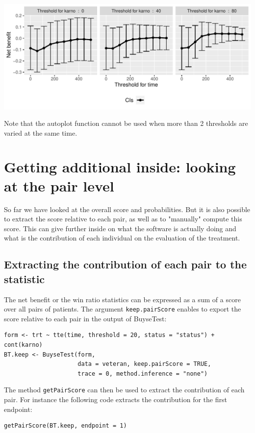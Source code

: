 \documentclass[12pt]{article}
\begin{document}
\begin{center}
\includegraphics[width=\textwidth]{./figures/gg-sensitivity2.pdf}
\end{center}

Note that the autoplot function cannot be used when more than 2
thresholds are varied at the same time.

\section{Getting additional inside: looking at the pair level}
\label{sec:org6c9f1b6}

So far we have looked at the overall score and probabilities. But it
is also possible to extract the score relative to each pair, as well
as to "manually" compute this score. This can give further inside on
what the software is actually doing and what is the contribution of
each individual on the evaluation of the treatment.

\subsection{Extracting the contribution of each pair to the statistic}
\label{sec:orgd15388a}
The net benefit or the win ratio statistics can be expressed as a sum
of a score over all pairs of patients. The argument \texttt{keep.pairScore}
enables to export the score relative to each pair in the output of
BuyseTest:
\lstset{language=r,label= ,caption= ,captionpos=b,numbers=none}
\begin{lstlisting}
form <- trt ~ tte(time, threshold = 20, status = "status") + cont(karno)
BT.keep <- BuyseTest(form,
                     data = veteran, keep.pairScore = TRUE, 
                     trace = 0, method.inference = "none")
\end{lstlisting}

The method \texttt{getPairScore} can then be used to extract the contribution
of each pair. For instance the following code extracts the
contribution for the first endpoint:
\lstset{language=r,label= ,caption= ,captionpos=b,numbers=none}
\begin{lstlisting}
getPairScore(BT.keep, endpoint = 1)
\end{lstlisting}
\end{document}
